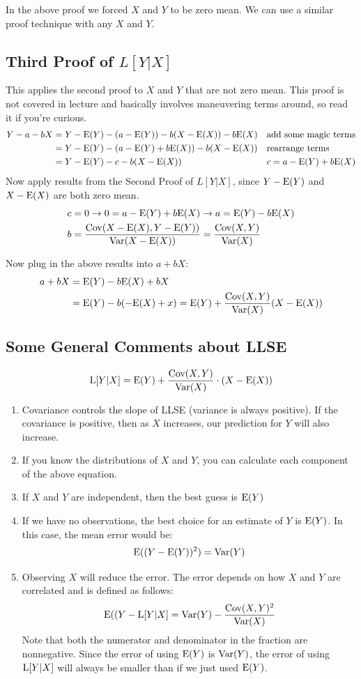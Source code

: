 \documentclass{exam}
\begin{document}
In the above proof we forced $X$ and $Y$ to be zero mean. We can use a similar proof technique with any $X$ and $Y$.

\subsection{Third Proof of $L[Y | X]$}
This applies the second proof to $X$ and $Y$ that are not zero mean. This proof is not covered in lecture and basically involves maneuvering terms around, so read it if you're curious.
\begin{align*}
Y - a - bX &= Y - \text{E}(Y) - (a - \text{E}(Y)) - b(X - \text{E}(X)) - b \text{E}(X) && \text{add some magic terms}\\
&= Y - \text{E}(Y) - (a - \text{E}(Y) + b \text{E}(X)) - b(X - \text{E}(X)) && \text{rearrange terms}\\
&= Y - \text{E}(Y) - c - b(X - \text{E}(X)) && \text{$c = a - \text{E}(Y) + b \text{E}(X)$}
\end{align*}
Now apply results from the Second Proof of $L[Y | X]$, since $Y - \text{E}(Y) $ and $X - \text{E}(X)$ are both zero mean. 
\begin{align*}
c & = 0 \rightarrow 0 = a - \text{E}(Y) + b \text{E}(X) \rightarrow a = \text{E}(Y) - b\text{E}(X)\\
b &= \frac{\text{Cov}(X - \text{E}(X), Y - \text{E}(Y))}{\text{Var}(X - \text{E}(X))} = \frac{\text{Cov}(X, Y)}{\text{Var}(X)}
\end{align*}

Now plug in the above results into $a + bX$:
\begin{align*}
a + bX &= \text{E}(Y) - b\text{E}(X) + bX\\
&= \text{E}(Y) - b (-\text{E}(X) + x) = \text{E}(Y) + \frac{\text{Cov}(X, Y)}{\text{Var}(X)}(X - \text{E}(X))
\end{align*}

\subsection{Some General Comments about LLSE}
\[\text{L}[Y | X] = \text{E}(Y) + \frac{\text{Cov}(X, Y)}{\text{Var}(X)} \cdot (X - \text{E}(X))\]
\begin{enumerate}
\item Covariance controls the slope of LLSE (variance is always positive). If the covariance is positive, then as $X$ increases, our prediction for $Y$ will also increase.
\item If you know the distributions of $X$ and $Y$, you can calculate each component of the above equation.
\item If $X$ and $Y$ are independent, then the best guess is $\text{E}(Y)$
\item If we have no observations, the best choice for an estimate of $Y$ is $\text{E}(Y)$. In this case, the mean error would be:
\[\text{E}((Y - \text{E}(Y))^2) = \text{Var}(Y)\]
\item Observing $X$ will reduce the error. The error depends on how $X$ and $Y$ are correlated and is defined as follows:
\[\text{E}((Y - \text{L}[Y | X] = \text{Var}(Y) - \frac{\text{Cov}(X, Y)^2}{\text{Var}(X)}\]
Note that both the numerator and denominator in the fraction are nonnegative. Since the error of using $\text{E}(Y)$ is $\text{Var}(Y)$, the error of using $\text{L}[Y | X]$ will always be smaller than if we just used $\text{E}(Y)$. 
\end{enumerate}
\end{document}
